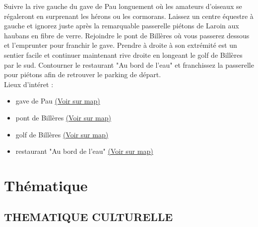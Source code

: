 \documentclass[titlepage]{article}
\begin{document}
                        Suivre la rive gauche du gave de Pau longuement où les amateurs d'oiseaux se régaleront en surprenant les hérons ou les cormorans. Laissez un centre équestre à gauche et ignorez juste après la remarquable passerelle piétons de Laroin aux haubans en fibre de verre. Rejoindre le pont de Billères où vous passerez dessous et l'emprunter pour franchir le gave. Prendre à droite à son extrémité est un sentier facile et continuer maintenant rive droite en longeant le golf de Billères par le sud. Contourner le restaurant "Au bord de l'eau" et franchissez la passerelle pour piétons afin de retrouver le parking de départ.
                    \\
        Lieux d'intéret : 
        \begin{itemize}
        
        \item {
        gave de
                            Pau 
        \href{https://www.google.com/maps/?q=43.287530, -0.391115}{(Voir sur map)}
        }
    
        \item {
        pont de
                            Billères 
        \href{https://www.google.com/maps/?q=43.287530, -0.391115}{(Voir sur map)}
        }
    
        \item {
        golf de
                            Billères 
        \href{https://www.google.com/maps/?q=43.287530, -0.391115}{(Voir sur map)}
        }
    
        \item {
        restaurant "Au bord de
                            l'eau" 
        \href{https://www.google.com/maps/?q=43.287530, -0.391115}{(Voir sur map)}
        }
    
        \end{itemize}
    
        \section{Thématique}
        
        \subsection{THEMATIQUE CULTURELLE}
    
\end{document}
